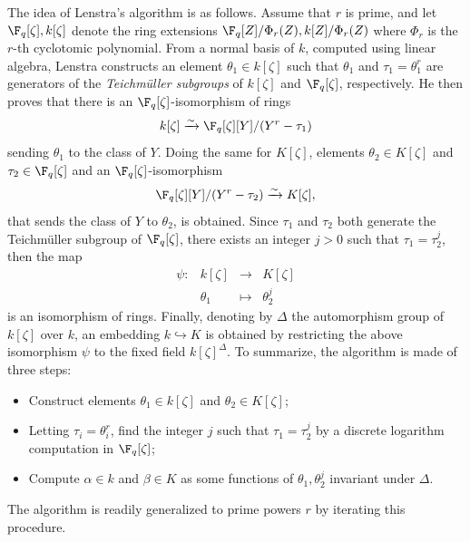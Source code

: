 The idea of Lenstra's algorithm is as follows.  Assume that $r$ is prime, and let $\F_q[\zeta], 
k[\zeta]$ denote the ring extensions $\F_q[Z] / \Phi_r(Z), k[Z] / \Phi_r(Z)$ where $\Phi_r$ is the 
$r$-th cyclotomic polynomial. From a normal basis of $k$, computed using linear algebra, Lenstra 
constructs an element $\theta_1 \in k[\zeta]$ such that $\theta_1$ and $\tau_1 = \theta_1^r$ are 
generators of the \textit{Teichm\"uller subgroups} of $k[\zeta]$ and $\F_q[\zeta]$, respectively. 
He then proves that there is an $\F_q[\zeta]$-isomorphism of rings
\[ k[\zeta] \xrightarrow{\sim} \F_q[\zeta][Y]/(Y^r - \tau_1) \]
sending $\theta_1$ to the class of $Y$. Doing the same for 
$K[\zeta]$, elements $\theta_2 \in K[\zeta]$ and $\tau_2 \in \F_q[\zeta]$ and an 
$\F_q[\zeta]$-isomorphism
\[ \F_q[\zeta][Y]/(Y^r - \tau_2) \xrightarrow{\sim} K[\zeta], \]
that sends the class of $Y$ to $\theta_2$, is obtained.
Since $\tau_1$ and $\tau_2$ both generate the Teichm\"uller subgroup of $\F_q[\zeta]$,
there exists an integer $j > 0$ such that $\tau_1=\tau_2^j$, then the map
\[
\begin{array}{lrll}
	\psi: & k[\zeta] & \rightarrow & K[\zeta] \\
	& \theta_1 & \mapsto & \theta_2^j
\end{array}
\]
is an isomorphism of rings. Finally, denoting by $\Delta$ the automorphism group of $k[\zeta]$
over $k$, an embedding $k \hookrightarrow K$ is obtained by restricting the above isomorphism 
$\psi$ to the fixed field $k[\zeta]^\Delta$. To summarize, the algorithm is made of three steps:
\begin{itemize}
	\item Construct elements $\theta_1\in k[\zeta]$ and $\theta_2\in K[\zeta]$;
	\item Letting $\tau_i=\theta_i^r$, find the integer $j$ such that
	  $\tau_1=\tau_2^j$ by a discrete logarithm computation in
	  $\F_q[\zeta]$;
	\item Compute $\alpha\in k$ and $\beta\in K$ as some functions of
	  $\theta_1,\theta_2^j$ invariant under $\Delta$.
\end{itemize}
The algorithm is readily generalized to prime powers $r$ by iterating this procedure.

